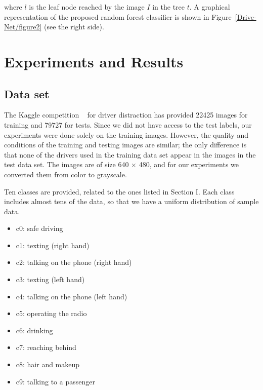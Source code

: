 where $l $ is the leaf node reached by the image $I $ in the tree $t $. A graphical representation of the proposed random forest classifier is shown in Figure~\ref{Drive-Net/figure2}  (see the right side).
    
\section{Experiments and Results}


\subsection{Data set} The Kaggle competition \unskip~\cite{1641075:26775858} for driver distraction has provided 22425 images for training and 79727 for tests. Since we did not have access to the test labels, our experiments were done solely on the training images. However, the quality and conditions of the training and testing images are similar; the only difference is that none of the drivers used in the training data set appear in the images in the test data set. The images are of size 640 \ensuremath{\times} 480, and for our experiments we converted them from color to grayscale.

Ten classes are provided, related to the ones listed in Section I. Each class includes almost tens of the data, so that we have a uniform distribution of sample data.

\begin{itemize}
  \item \relax c0: safe driving
  \item \relax c1: texting (right hand)
  \item \relax c2: talking on the phone (right hand)
  \item \relax c3: texting (left hand)
  \item \relax c4: talking on the phone (left hand)
  \item \relax c5: operating the radio
  \item \relax c6: drinking
  \item \relax c7: reaching behind
  \item \relax c8: hair and makeup
  \item \relax c9: talking to a passenger
\end{itemize}
  


